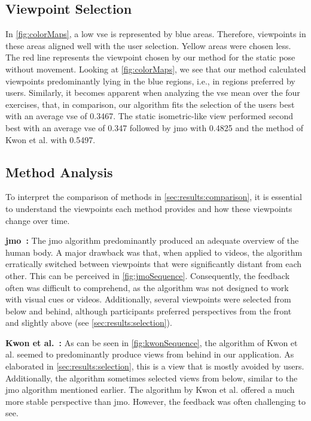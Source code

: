 \subsection{Viewpoint Selection \label{sec:results:selection}}
In \autoref{fig:colorMaps}, a low \acrshort{vse} is represented by blue areas. Therefore, viewpoints in these areas aligned well with the user selection. Yellow areas were chosen less. The red line represents the viewpoint chosen by our method for the static pose without movement. Looking at \autoref{fig:colorMaps}, we see that our method calculated viewpoints predominantly lying in the blue regions, i.e., in regions preferred by users. Similarly, it becomes apparent when analyzing the \acrshort{vse} mean over the four exercises, that, in comparison, our algorithm fits the selection of the users best with an average \acrshort{vse} of 0.3467. The static isometric-like view performed second best with an average \acrshort{vse} of 0.347 followed by \acrshort{jmo} with 0.4825 and the method of Kwon et al. with 0.5497.

\subsection{Method Analysis\label{sec:results:analysis}}
To interpret the comparison of methods in \autoref{sec:results:comparison}, it is essential to understand the viewpoints each method provides and how these viewpoints change over time.

\textbf{\acrshort{jmo}~\cite{ishara2015mra}:}
The \acrshort{jmo} algorithm predominantly produced an adequate overview of the human body. A major drawback was that, when applied to videos, the algorithm erratically switched between viewpoints that were significantly distant from each other. This can be perceived in \autoref{fig:jmoSequence}. Consequently, the feedback often was difficult to comprehend, as the algorithm was not designed to work with visual cues or videos. Additionally, several viewpoints were selected from below and behind, although participants preferred perspectives from the front and slightly above (see \autoref{sec:results:selection}).

\textbf{Kwon et al.~\cite{kwon2020ocp}:} 
As can be seen in \autoref{fig:kwonSequence}, the algorithm of Kwon et al. seemed to predominantly produce views from behind in our application. As elaborated in \autoref{sec:results:selection}, this is a view that is mostly avoided by users. Additionally, the algorithm sometimes selected views from below, similar to the \acrshort{jmo} algorithm mentioned earlier. The algorithm by Kwon et al. offered a much more stable perspective than \acrshort{jmo}. However, the feedback was often challenging to see.

